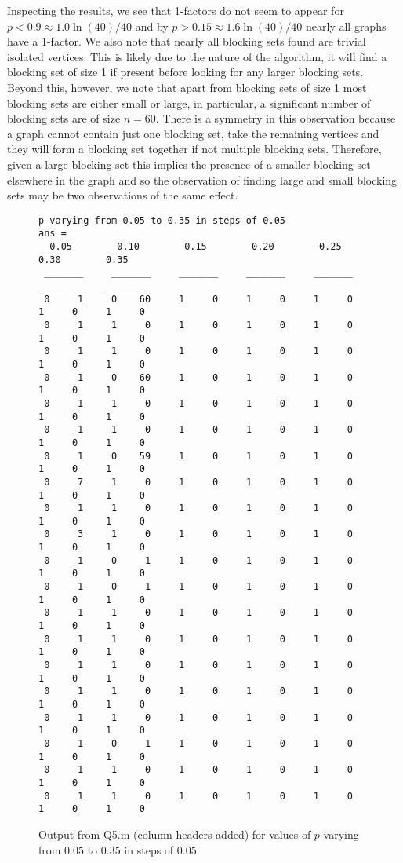 \documentclass[a4paper]{article}
\begin{document}
\bigskip
Inspecting the results, we see that 1-factors do not seem to appear for $p<0.9\approx 1.0\ln(40)/40$ and by $p>0.15\approx1.6\ln(40)/40$ nearly all graphs have a 1-factor. We also note that nearly all blocking sets found are trivial isolated vertices. This is likely due to the nature of the algorithm, it will find a blocking set of size 1 if present before looking for any larger blocking sets. Beyond this, however, we note that apart from blocking sets of size 1 most blocking sets are either small or large, in particular, a significant number of blocking sets are of size $n=60$. There is a symmetry in this observation because a graph cannot contain just one blocking set, take the remaining vertices and they will form a blocking set together if not multiple blocking sets. Therefore, given a large blocking set this implies the presence of a smaller blocking set elsewhere in the graph and so the observation of finding large and small blocking sets may be two observations of the same effect.

\begin{figure}[H]
    \centering
    \begin{verbatim}
p varying from 0.05 to 0.35 in steps of 0.05
ans =
  0.05        0.10        0.15        0.20        0.25        0.30        0.35  
 _______     _______     _______     _______     _______     _______     _______
 0     1     0    60     1     0     1     0     1     0     1     0     1     0
 0     1     1     0     1     0     1     0     1     0     1     0     1     0
 0     1     1     0     1     0     1     0     1     0     1     0     1     0
 0     1     0    60     1     0     1     0     1     0     1     0     1     0
 0     1     1     0     1     0     1     0     1     0     1     0     1     0
 0     1     1     0     1     0     1     0     1     0     1     0     1     0
 0     1     0    59     1     0     1     0     1     0     1     0     1     0
 0     7     1     0     1     0     1     0     1     0     1     0     1     0
 0     1     1     0     1     0     1     0     1     0     1     0     1     0
 0     3     1     0     1     0     1     0     1     0     1     0     1     0
 0     1     0     1     1     0     1     0     1     0     1     0     1     0
 0     1     0     1     1     0     1     0     1     0     1     0     1     0
 0     1     1     0     1     0     1     0     1     0     1     0     1     0
 0     1     1     0     1     0     1     0     1     0     1     0     1     0
 0     1     1     0     1     0     1     0     1     0     1     0     1     0
 0     1     1     0     1     0     1     0     1     0     1     0     1     0
 0     1     1     0     1     0     1     0     1     0     1     0     1     0
 0     1     0     1     1     0     1     0     1     0     1     0     1     0
 0     1     1     0     1     0     1     0     1     0     1     0     1     0
 0     1     1     0     1     0     1     0     1     0     1     0     1     0
    \end{verbatim}
    \caption{Output from Q5.m (column headers added) for values of $p$ varying from $0.05$ to $0.35$ in steps of $0.05$}
    \label{fig:q5a}
\end{figure}
\end{document}
